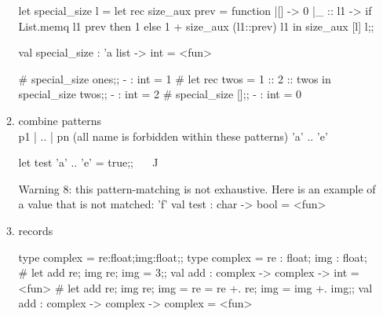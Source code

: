 \begin{enumerate}
\begin{enumerate}
\begin{ocamlcode}
 let special_size l = 
    let rec size_aux prev = function 
      |[] -> 0 
      |_ :: l1  -> if List.memq l1 prev then 1 else 1 + size_aux (l1::prev) l1 in size_aux [l]  l;;
    \end{ocamlcode}
\begin{ocamlcode}    
  val special_size : 'a list -> int = <fun>
\end{ocamlcode}

\begin{alternate}
# special_size ones;;
- : int = 1
# let rec twos = 1 :: 2 :: twos in special_size twos;;
- : int = 2
# special_size [];;
- : int = 0
\end{alternate}  
\item combine patterns \\
  p1 | .. |  pn (all name is forbidden within these patterns) 
 'a' .. 'e' 

 \begin{alternate}
let test 'a' .. 'e' = true;;
^^^^^^^^^^^^^^^^^
 \end{alternate}

\begin{ocamlcode}
Warning 8: this pattern-matching is not exhaustive.
Here is an example of a value that is not matched:
'f'
val test : char -> bool = <fun>
\end{ocamlcode}

    \item records

\begin{alternate}
type complex = {re:float;img:float};;
type complex = { re : float; img : float; }
# let add {re; img} {re; img} = 3;;
val add : complex -> complex -> int = <fun>
# let add {re; img} {re; img} = {re = re +. re; img = img +. img};;
val add : complex -> complex -> complex = <fun>
 \end{alternate}


\end{enumerate}
\end{enumerate}
